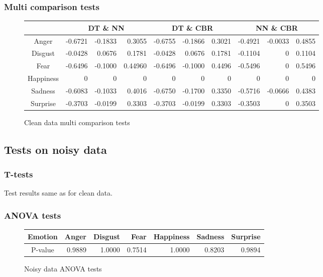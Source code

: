 \documentclass[a4paper,11pt]{article}
\begin{document}
\subsubsection{Multi comparison tests}
\begin{figure}[h]
    \begin{center}
    \begin{tabular}{|c||r|r|r|r|r|r|r|r|r|} \hline 
    & \multicolumn{3}{|c|}{DT \& NN} & \multicolumn{3}{|c|}{DT \& CBR} & \multicolumn{3}{|c|}{NN \& CBR} \\ \hline \hline
    Anger & -0.6721 & -0.1833 & 0.3055 &-0.6755 & -0.1866 & 0.3021 & -0.4921 & -0.0033 & 0.4855\\ \hline
    Disgust & -0.0428 & 0.0676 & 0.1781 & -0.0428 & 0.0676 & 0.1781 & -0.1104 & 0 & 0.1104 \\ \hline
    Fear & -0.6496 & -0.1000 & 0.44960 & -0.6496 & -0.1000 & 0.4496 & -0.5496 & 0 & 0.5496 \\ \hline
    Happiness & 0 & 0 & 0& 0 & 0 & 0 & 0 & 0 & 0 \\ \hline
    Sadness & -0.6083 & -0.1033 & 0.4016 & -0.6750 & -0.1700 & 0.3350 & -0.5716 & -0.0666 & 0.4383 \\ \hline
    Surprise & -0.3703 & -0.0199 & 0.3303 & -0.3703 & -0.0199 & 0.3303 & -0.3503 & 0 & 0.3503 \\ \hline
    \end{tabular}
    \caption{Clean data multi comparison tests}
    \end{center}
\end{figure}

\subsection{Tests on noisy data}
\subsubsection{T-tests}
Test results same as for clean data.

\subsubsection{ANOVA tests}

\begin{figure}[h]
    \begin{center}
    \begin{tabular}{|c||r|r|r|r|r|r|} \hline 
    Emotion & Anger & Disgust & Fear & Happiness & Sadness & Surprise \\ \hline \hline
    P-value & 0.9889 & 1.0000 & 0.7514 & 1.0000 & 0.8203 & 0.9894 \\ \hline
    \end{tabular}
    \caption{Noisy data ANOVA tests}
    \end{center}
\end{figure}
\end{document}
